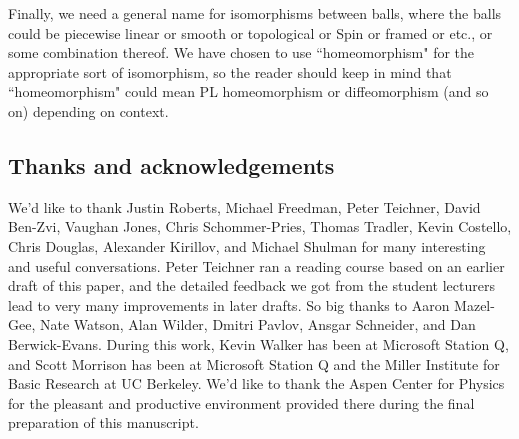 Finally, we need a general name for isomorphisms between balls, where the balls could be
piecewise linear or smooth or topological or Spin or framed or etc., or some combination thereof.
We have chosen to use ``homeomorphism" for the appropriate sort of isomorphism, so the reader should
keep in mind that ``homeomorphism" could mean PL homeomorphism or diffeomorphism (and so on)
depending on context.

\subsection{Thanks and acknowledgements}
We'd like to thank 
Justin Roberts, 
Michael Freedman, 
Peter Teichner, 
David Ben-Zvi, 
Vaughan Jones, 
Chris Schommer-Pries, 
Thomas Tradler,
Kevin Costello, 
Chris Douglas,
Alexander Kirillov,
and
Michael Shulman
for many interesting and useful conversations. 
Peter Teichner ran a reading course based on an earlier draft of this paper, and the detailed feedback
we got from the student lecturers lead to very many improvements in later drafts.
So big thanks to
Aaron Mazel-Gee,
Nate Watson,
Alan Wilder,
Dmitri Pavlov,
Ansgar Schneider,
and
Dan Berwick-Evans.
During this work, Kevin Walker has been at Microsoft Station Q, and Scott Morrison has been at 
Microsoft Station Q and the Miller Institute for Basic Research at UC Berkeley. 
We'd like to thank the Aspen Center for Physics for the pleasant and productive 
environment provided there during the final preparation of this manuscript.

